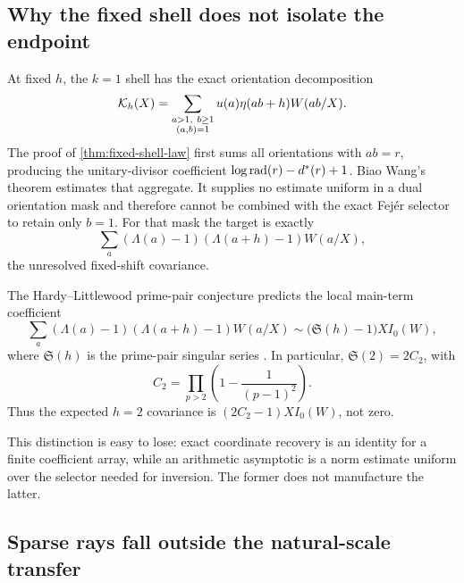 \subsection{Why the fixed shell does not isolate the endpoint}

At fixed $h$, the $k=1$ shell has the exact orientation decomposition
\begin{equation}
 \mathcal K_h(X)=
 \sum_{\substack{a>1,\ b\geq1\\(a,b)=1}}
 u(a)\eta(ab+h)W(ab/X).
 \label{eq:fixed-shell-orientation-decomposition}
\end{equation}
The proof of \cref{thm:fixed-shell-law} first sums all orientations with
$ab=r$, producing the unitary-divisor coefficient
$\log\operatorname{rad}(r)-d^*(r)+1$.  Biao Wang's theorem estimates that aggregate.
It supplies no estimate uniform in a dual orientation mask and therefore
cannot be combined with the exact Fej\'er selector to retain only $b=1$.
For that mask the target is exactly
\begin{equation}
 \sum_a(\Lambda(a)-1)(\Lambda(a+h)-1)W(a/X),
 \label{eq:fixed-endpoint-boundary}
\end{equation}
the unresolved fixed-shift covariance.

The Hardy--Littlewood prime-pair conjecture predicts the local main-term
coefficient
\begin{equation}
 \sum_a(\Lambda(a)-1)(\Lambda(a+h)-1)W(a/X)
 \sim\bigl(\mathfrak S(h)-1\bigr)XI_0(W),
 \label{eq:expected-fixed-covariance}
\end{equation}
where $\mathfrak S(h)$ is the prime-pair singular series
\citep{HardyLittlewood1923}.  In particular,
$\mathfrak S(2)=2C_2$, with
\[
 C_2=\prod_{p>2}\left(1-\frac1{(p-1)^2}\right).
\]
Thus the expected $h=2$ covariance is
$(2C_2-1)XI_0(W)$, not zero.

This distinction is easy to lose: exact coordinate recovery is an
identity for a finite coefficient array, while an arithmetic asymptotic is
a norm estimate uniform over the selector needed for inversion.  The
former does not manufacture the latter.

\subsection{Sparse rays fall outside the natural-scale transfer}

